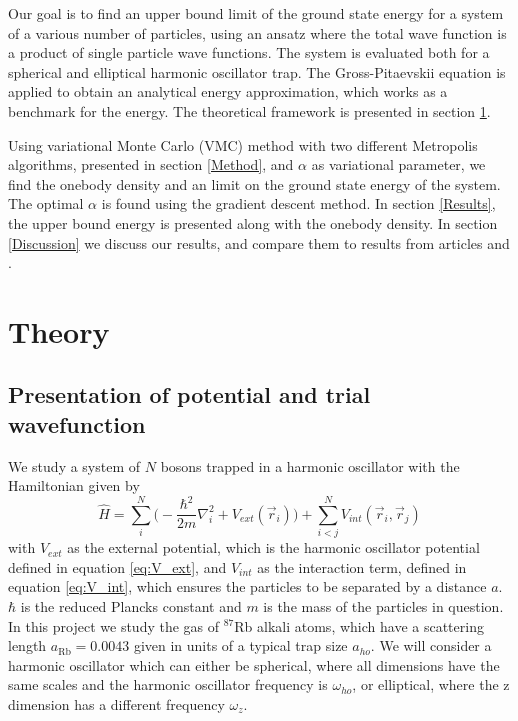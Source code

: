\documentclass[norsk,a4paper,12pt]{article}
\begin{document}
Our goal is to find an upper bound limit of the ground state energy for a system of a various number of particles, using an ansatz where the total wave function is a product of single particle wave functions. The system is evaluated both for a spherical and elliptical harmonic oscillator trap. The Gross-Pitaevskii equation is applied to obtain an analytical energy approximation, which works as a benchmark for the energy. The theoretical framework is presented in section \ref{Theory}. \par

Using variational Monte Carlo (VMC) method with two different Metropolis algorithms, presented in section \ref{Method}, and $\alpha$ as variational parameter, we find the onebody density and an limit on the ground state energy of the system. The optimal $\alpha$ is found using the gradient descent method. In section \ref{Results}, the upper bound energy is presented along with the onebody density. In section \ref{Discussion} we discuss our results, and compare them to results from articles \cite{DuBois} and \cite{Dalfovo}.


\section{Theory} \label{Theory}

\subsection{Presentation of potential and trial wavefunction} 

We study a system of $N$ bosons trapped in a harmonic oscillator with the Hamiltonian given by 
\begin{equation}
\hat{H}=\sum_i^N\bigg(-\frac{\hbar^2}{2m}\nabla_i^2+V_{ext}(\vec{r}_i)\bigg)+\sum_{i<j}^NV_{int}(\vec{r}_i,\vec{r}_j)
\label{eq:Hamilton}
\end{equation}
with $V_{ext}$ as the external potential, which is the harmonic oscillator potential defined in equation \ref{eq:V_ext}, and $V_{int}$ as the interaction term, defined in equation \ref{eq:V_int}, which ensures the particles to be separated by a distance $a$. $\hbar$ is the reduced Plancks constant and $m$ is the mass of the particles in question. In this project we study the gas of $^{87}$Rb alkali atoms, which have a scattering length $a_{\text{Rb}}=0.0043$ given in units of a typical trap size $a_{ho}$. We will consider a harmonic oscillator which can either be spherical, where all dimensions have the same scales and the harmonic oscillator frequency is $\omega_{ho}$, or elliptical, where the z dimension has a different frequency $\omega_z$.
\end{document}
